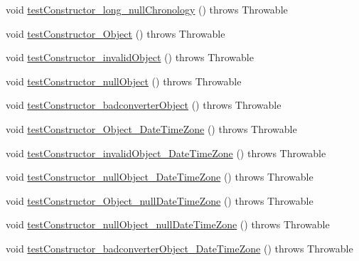 \begin{DoxyCompactItemize}
\item 
void \hyperlink{classorg_1_1joda_1_1time_1_1_test_date_midnight___constructors_ad2c6881bb582618fe066066b9e844255}{test\-Constructor\-\_\-long\-\_\-null\-Chronology} ()  throws Throwable 
\item 
void \hyperlink{classorg_1_1joda_1_1time_1_1_test_date_midnight___constructors_a61062df6206ef3b8142fe6fcbb8a939f}{test\-Constructor\-\_\-\-Object} ()  throws Throwable 
\item 
void \hyperlink{classorg_1_1joda_1_1time_1_1_test_date_midnight___constructors_a3324c42f66118d3c633bc3808e744ec1}{test\-Constructor\-\_\-invalid\-Object} ()  throws Throwable 
\item 
void \hyperlink{classorg_1_1joda_1_1time_1_1_test_date_midnight___constructors_ab9c4c8456bb9c3cb23cadae2c8177ce0}{test\-Constructor\-\_\-null\-Object} ()  throws Throwable 
\item 
void \hyperlink{classorg_1_1joda_1_1time_1_1_test_date_midnight___constructors_a5bbf61632521c6c5cebb5b29d84537fd}{test\-Constructor\-\_\-badconverter\-Object} ()  throws Throwable 
\item 
void \hyperlink{classorg_1_1joda_1_1time_1_1_test_date_midnight___constructors_ac9fc036b69e89e66958f6dde270cf80e}{test\-Constructor\-\_\-\-Object\-\_\-\-Date\-Time\-Zone} ()  throws Throwable 
\item 
void \hyperlink{classorg_1_1joda_1_1time_1_1_test_date_midnight___constructors_a2f9cbffe908d89574b0cb983b2d0401e}{test\-Constructor\-\_\-invalid\-Object\-\_\-\-Date\-Time\-Zone} ()  throws Throwable 
\item 
void \hyperlink{classorg_1_1joda_1_1time_1_1_test_date_midnight___constructors_aee2c7da9f095680015925c689af5c06b}{test\-Constructor\-\_\-null\-Object\-\_\-\-Date\-Time\-Zone} ()  throws Throwable 
\item 
void \hyperlink{classorg_1_1joda_1_1time_1_1_test_date_midnight___constructors_a04ba428308bac4a140a7ef63ff77698e}{test\-Constructor\-\_\-\-Object\-\_\-null\-Date\-Time\-Zone} ()  throws Throwable 
\item 
void \hyperlink{classorg_1_1joda_1_1time_1_1_test_date_midnight___constructors_a50400acc452e58ac7597e2bd80ba16dc}{test\-Constructor\-\_\-null\-Object\-\_\-null\-Date\-Time\-Zone} ()  throws Throwable 
\item 
void \hyperlink{classorg_1_1joda_1_1time_1_1_test_date_midnight___constructors_ae813f6da76f776274011dbce297b837e}{test\-Constructor\-\_\-badconverter\-Object\-\_\-\-Date\-Time\-Zone} ()  throws Throwable 
\item 

\end{DoxyCompactItemize}
